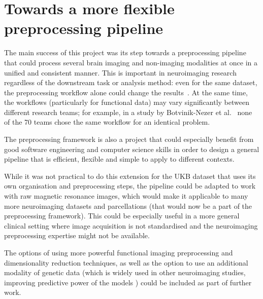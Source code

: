 \section{Towards a more flexible preprocessing pipeline}
The main success of this project was its step towards a preprocessing pipeline that could process several brain imaging and non-imaging modalities at once in a unified and consistent manner. This is important in neuroimaging research regardless of the downstream task or analysis method: even for the same dataset, the preprocessing workflow alone could change the results~\cite{salehi2020there}. At the same time, the workflows (particularly for functional data) may vary significantly between different research teams; for example, in a study by Botvinik-Nezer et al.~\cite{botvinik2019variability} none of the 70 teams chose the same workflow for an identical problem.

The preprocessing framework is also a project that could especially benefit from good software engineering and computer science skills in order to design a general pipeline that is efficient, flexible and simple to apply to different contexts.

While it was not practical to do this extension for the UKB dataset that uses its own organisation and preprocessing steps, the pipeline could be adapted to work with raw magnetic resonance images, which would make it applicable to many more neuroimaging datasets and parcellations (that would now be a part of the preprocessing framework). This could be especially useful in a more general clinical setting where image acquisition is not standardised and the neuroimaging preprocessing expertise might not be available.

The options of using more powerful functional imaging preprocessing and dimensionality reduction techniques, as well as the option to use an additional modality of genetic data (which is widely used in other neuroimaging studies, improving predictive power of the models \cite{cole2018brain,parisot2018disease}) could be included as part of further work.


